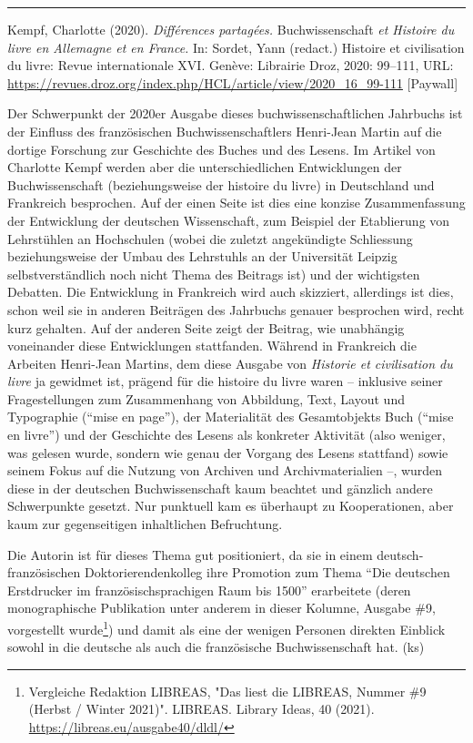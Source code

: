 \documentclass[a4paper,
fontsize=11pt,
oneside,
numbers=noperiodatend,
parskip=half-,
bibliography=totoc,
final
]{scrartcl}
\begin{document}
\begin{center}\rule{0.5\linewidth}{0.5pt}\end{center}

Kempf, Charlotte (2020). \emph{Différences partagées.} Buchwissenschaft
\emph{et Histoire du livre en Allemagne et en France.} In: Sordet, Yann
(redact.) Histoire et civilisation du livre: Revue internationale XVI.
Genève: Librairie Droz, 2020: 99--111, URL:
\url{https://revues.droz.org/index.php/HCL/article/view/2020_16_99-111}
{[}Paywall{]}

Der Schwerpunkt der 2020er Ausgabe dieses buchwissenschaftlichen
Jahrbuchs ist der Einfluss des französischen Buchwissenschaftlers
Henri-Jean Martin auf die dortige Forschung zur Geschichte des Buches
und des Lesens. Im Artikel von Charlotte Kempf werden aber die
unterschiedlichen Entwicklungen der Buchwissenschaft (beziehungsweise
der histoire du livre) in Deutschland und Frankreich besprochen. Auf der
einen Seite ist dies eine konzise Zusammenfassung der Entwicklung der
deutschen Wissenschaft, zum Beispiel der Etablierung von Lehrstühlen an
Hochschulen (wobei die zuletzt angekündigte Schliessung beziehungsweise
der Umbau des Lehrstuhls an der Universität Leipzig selbstverständlich
noch nicht Thema des Beitrags ist) und der wichtigsten Debatten. Die
Entwicklung in Frankreich wird auch skizziert, allerdings ist dies,
schon weil sie in anderen Beiträgen des Jahrbuchs genauer besprochen
wird, recht kurz gehalten. Auf der anderen Seite zeigt der Beitrag, wie
unabhängig voneinander diese Entwicklungen stattfanden. Während in
Frankreich die Arbeiten Henri-Jean Martins, dem diese Ausgabe von
\emph{Historie et civilisation du livre} ja gewidmet ist, prägend für
die histoire du livre waren -- inklusive seiner Fragestellungen zum
Zusammenhang von Abbildung, Text, Layout und Typographie (\enquote{mise
en page}), der Materialität des Gesamtobjekts Buch (\enquote{mise en
livre}) und der Geschichte des Lesens als konkreter Aktivität (also
weniger, was gelesen wurde, sondern wie genau der Vorgang des Lesens
stattfand) sowie seinem Fokus auf die Nutzung von Archiven und
Archivmaterialien --, wurden diese in der deutschen Buchwissenschaft
kaum beachtet und gänzlich andere Schwerpunkte gesetzt. Nur punktuell
kam es überhaupt zu Kooperationen, aber kaum zur gegenseitigen
inhaltlichen Befruchtung.

Die Autorin ist für dieses Thema gut positioniert, da sie in einem
deutsch-französischen Doktorierendenkolleg ihre Promotion zum Thema
\enquote{Die deutschen Erstdrucker im französischsprachigen Raum bis
1500} erarbeitete (deren monographische Publikation unter anderem in
dieser Kolumne, Ausgabe \#9, vorgestellt wurde\footnote{Vergleiche
  Redaktion LIBREAS, "Das liest die LIBREAS, Nummer \#9 (Herbst / Winter
  2021)". LIBREAS. Library Ideas, 40 (2021).
  \url{https://libreas.eu/ausgabe40/dldl/}}) und damit als eine der
wenigen Personen direkten Einblick sowohl in die deutsche als auch die
französische Buchwissenschaft hat. (ks)
\end{document}
